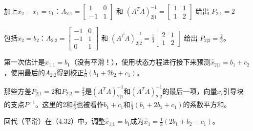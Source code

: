 	加上$x_2-x_1=c_1$：\quad $A_{2|1}=\begin{bmatrix} 1 & 0 \\ -1 & 1 \end{bmatrix}$
	和 $(A^TA)^{-1}_{2|1}=\begin{bmatrix} 1 & 1 \\ 1 & 2 \end{bmatrix}$ 给出  $P_{2|1}=2$
	
	包括$x_2=b_2$：\quad  $A_{2|2}=\begin{bmatrix} -1 & 0 \\ -1 & 1 \\ 0 & 1 \end{bmatrix}$
	和 $(A^TA)^{-1}_{2|2}=\frac{1}{3}\begin{bmatrix} 2 & 1 \\ 1 & 2 \end{bmatrix}$ 给出  $P_{2|2}=\frac{2}{3}$。
	
	第一次估计是$\hat{x}_{1|1}=b_1$（没有平滑！），使用状态方程进行接下来预测$\hat{x}_{2|1}=b_1+c_2$，使用最后的$A_{2|2}$得到校正$\frac{1}{3}(b_1+2b_2+c_1)$。
	
	那些方差$P_{2|1}=2$和$P_{2|2}=\frac{2}{3}$是$(A^TA)^{-1}_{2|1}$和$(A^TA)^{-1}_{2|2}$的最后一项，向量$x_i$引导块的支点$P^{-1}$。这里的2和$\frac{2}{3}$也被看作$b_1+c_1$和$\frac{1}{3}(b_1+2b_2+c_1)$的系数平方和。
	
	回代（平滑）在（4.32）中，调整$\hat{x}_{1|1}=b_1$成为$\hat{x}_1=\frac{1}{3}(2b_1+b_2-c_1)$。